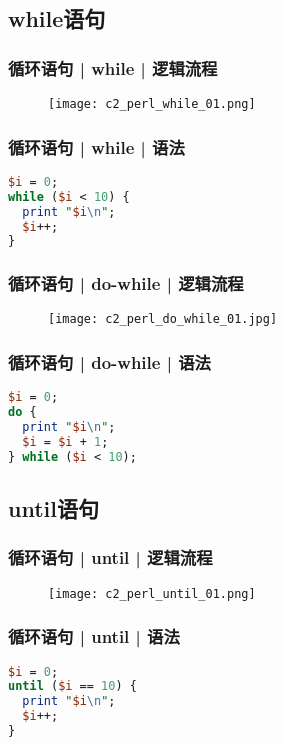 \subsection{while语句}
\begin{frame}
  \frametitle{循环语句 | while | 逻辑流程}
  \begin{figure}
    \centering
    \texttt{[image: c2\_perl\_while\_01.png]}
  \end{figure}
\end{frame}

\begin{frame}[fragile]
  \frametitle{循环语句 | while | \alert{语法}}
\begin{lstlisting}[language=Perl]
$i = 0;
while ($i < 10) {
  print "$i\n";
  $i++;
}
\end{lstlisting}
\end{frame}

\begin{frame}
  \frametitle{循环语句 | do-while | 逻辑流程}
  \begin{figure}
    \centering
    \texttt{[image: c2\_perl\_do\_while\_01.jpg]}
  \end{figure}
\end{frame}

\begin{frame}[fragile]
  \frametitle{循环语句 | do-while | 语法}
\begin{lstlisting}[language=Perl]
$i = 0;
do {
  print "$i\n";
  $i = $i + 1;
} while ($i < 10);
\end{lstlisting}
\end{frame}

\subsection{until语句}
\begin{frame}
  \frametitle{循环语句 | until | 逻辑流程}
  \begin{figure}
    \centering
    \texttt{[image: c2\_perl\_until\_01.png]}
  \end{figure}
\end{frame}

\begin{frame}[fragile]
  \frametitle{循环语句 | until | \alert{语法}}
\begin{lstlisting}[language=Perl]
$i = 0;
until ($i == 10) {
  print "$i\n";
  $i++;
}
\end{lstlisting}
\end{frame}

